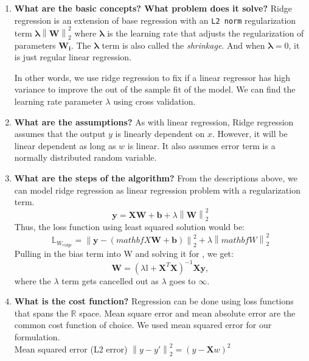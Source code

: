 \documentclass{article}
\begin{document}
\noindent
\begin{enumerate}
    \item \textbf{What are the basic concepts? What problem does it solve?}
    \noindent 
    \smallbreak
    Ridge regression is an extension of base regression with an \verb|L2 norm| regularization term $\mathbf{\lambda}\left\| \mathbf{W}\right\|_{2}^{2}$ where $\mathbf{\lambda}$ is the learning rate that adjusts the regularization of parameters $\mathbf{W_{i}}$. \cite{1} The $\mathbf{\lambda}$ term is also called the \emph{shrinkage}. And when $\mathbf{\lambda} = 0$, it is just regular linear regression.
    
    In other words, we use ridge regression to fix if a linear regressor has high variance to improve the out of the sample fit of the model. We can find the learning rate parameter $\lambda$ using cross validation.
    
    \item \textbf{What are the assumptions?}
    \noindent 
    \smallbreak
    As with linear regression, Ridge regression assumes that the output $y$ is linearly dependent on $x$. However, it will be linear dependent as long as $w$ is linear. It also assumes error term is a normally distributed random variable.
    
    \item \textbf{What are the steps of the algorithm?}
    \noindent 
    \smallbreak
    From the descriptions above, we can model ridge regression as linear regression problem with a regularization term.
    $$\mathbf{y} = \mathbf{X}\mathbf{W} + \mathbf{b} + \lambda\left\|\mathbf{W}\right\|_{2}^{2}$$
    Thus, the loss function using least squared solution would be:
    $$\mathbb{L}_{W_{ridge}} = \left\|\mathbf{y} - (mathbf{X}\mathbf{W} + \mathbf{b})\right\|_{2}^{2} + \lambda\left\|mathbf{W}\right\|_{2}^{2}$$
    Pulling in the bias term into W and solving it for , we get: 
    $$\mathbf{W} = (\lambda\mathbb{I} + \mathbf{X}^{T}\mathbf{X})^{-1}\mathbf{X}\mathbf{y},$$
    where the $\lambda$ term gets cancelled out as $\lambda$ goes to $\infty$.
    
    \item \textbf{What is the cost function?}
    \noindent 
    \smallbreak
    Regression can be done using loss functions that spans the $\mathbb{R}$ space. Mean square error and mean absolute error are the common cost function of choice. We used mean squared error for our formulation.\\
    \smallbreak
    Mean squared error (L2 error)  $\left\|y - y'\right\|_{2}^2 = (y - \mathbf{X}w)^2$ \\
    \smallbreak
    

\end{enumerate}
\end{document}
